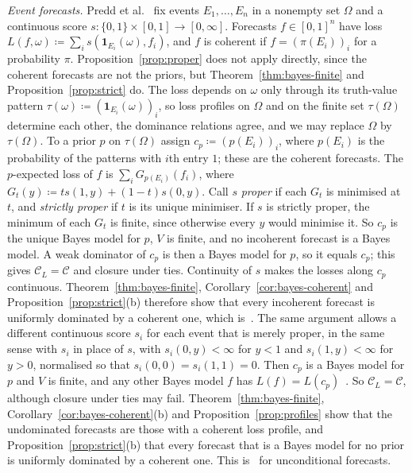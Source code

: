 \documentclass[11pt]{article}
\theoremstyle{definition}
\theoremstyle{remark}
\newcommand{\C}{\mathcal C}
\newcommand{\one}{\mathbf 1}
\begin{document}
\emph{Event forecasts.} Predd et al.~\cite{Predd} fix events $E_1,\dots,E_n$ in a nonempty set $\Omega$ and a continuous score $s:\{0,1\}\times[0,1]\to[0,\infty]$. Forecasts $f\in[0,1]^n$ have loss $L(f,\omega)\coloneqq\sum_is(\one_{E_i}(\omega),f_i)$, and $f$ is coherent if $f=(\pi(E_i))_i$ for a probability $\pi$. Proposition~\ref{prop:proper} does not apply directly, since the coherent forecasts are not the priors, but Theorem~\ref{thm:bayes-finite} and Proposition~\ref{prop:strict} do. The loss depends on $\omega$ only through its truth-value pattern $\tau(\omega)\coloneqq(\one_{E_i}(\omega))_i$, so loss profiles on $\Omega$ and on the finite set $\tau(\Omega)$ determine each other, the dominance relations agree, and we may replace $\Omega$ by $\tau(\Omega)$. To a prior $p$ on $\tau(\Omega)$ assign $c_p\coloneqq(p(E_i))_i$, where $p(E_i)$ is the probability of the patterns with $i$th entry $1$; these are the coherent forecasts. The $p$-expected loss of $f$ is $\sum_iG_{p(E_i)}(f_i)$, where $G_t(y)\coloneqq ts(1,y)+(1-t)s(0,y)$. Call $s$ \emph{proper} if each $G_t$ is minimised at $t$, and \emph{strictly proper} if $t$ is its unique minimiser. If $s$ is strictly proper, the minimum of each $G_t$ is finite, since otherwise every $y$ would minimise it. So $c_p$ is the unique Bayes model for $p$, $V$ is finite, and no incoherent forecast is a Bayes model. A weak dominator of $c_p$ is then a Bayes model for $p$, so it equals $c_p$; this gives $\C_L=\C$ and closure under ties. Continuity of $s$ makes the losses along $c_p$ continuous. Theorem~\ref{thm:bayes-finite}, Corollary~\ref{cor:bayes-coherent} and Proposition~\ref{prop:strict}(b) therefore show that every incoherent forecast is uniformly dominated by a coherent one, which is~\cite[Theorem~1]{Predd}. The same argument allows a different continuous score $s_i$ for each event that is merely proper, in the same sense with $s_i$ in place of $s$, with $s_i(0,y)<\infty$ for $y<1$ and $s_i(1,y)<\infty$ for $y>0$, normalised so that $s_i(0,0)=s_i(1,1)=0$. Then $c_p$ is a Bayes model for $p$ and $V$ is finite, and any other Bayes model $f$ has $L(f)=L(c_p)$~\cite[Lemma~5]{SSK09}. So $\C_L=\C$, although closure under ties may fail. Theorem~\ref{thm:bayes-finite}, Corollary~\ref{cor:bayes-coherent}(b) and Proposition~\ref{prop:profiles} show that the undominated forecasts are those with a coherent loss profile, and Proposition~\ref{prop:strict}(b) that every forecast that is a Bayes model for no prior is uniformly dominated by a coherent one. This is~\cite[Theorem~2, Conclusion~3]{SSK09} for unconditional forecasts.
\end{document}
